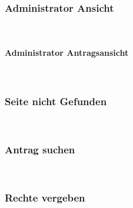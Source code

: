 \newpage
\subsubsection{Administrator Ansicht}
~\\

\newpage
\paragraph{Administrator Antragsansicht}
~\\

\newpage
\subsubsection{Seite nicht Gefunden}
~\\

\newpage
\subsubsection{Antrag suchen}
~\\

\newpage
\subsubsection{Rechte vergeben}
~\\



